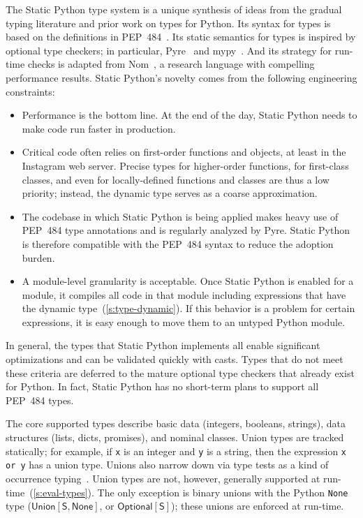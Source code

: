 \documentclass[english,cleveref,submission]{programming}
\newcommand{\SP}{Static Python}
\newcommand{\PEP}{PEP~484}
\newcommand{\code}[1]{\texttt{#1}}
\newcommand{\typefont}[1]{\mathsf{#1}}
\newcommand{\paramtype}[2]{#1[#2]}
\newcommand{\sptype}{\typefont{S}}
\newcommand{\sptnone}{\typefont{None}}
\newcommand{\sptoptional}[1]{\paramtype{\typefont{Optional}}{#1}}
\newcommand{\sptunion}[1]{\paramtype{\typefont{Union}}{#1}}
\begin{document}
The \SP{} type system is a unique synthesis of ideas from the gradual typing literature
and prior work on types for Python.
Its syntax for types is based on the definitions in \PEP{}~\cite{pep484}.
Its static semantics for types is inspired by optional type checkers; in
particular, Pyre~\cite{pyre} and mypy~\cite{mypy}.
And its strategy for run-time checks is adapted from Nom~\cite{mt-oopsla-2017,mt-oopsla-2021},
a research language with compelling performance results.
\SP{}'s novelty comes from the following engineering constraints:
\begin{itemize}
  \item
    Performance is the bottom line.
    At the end of the day, \SP{} needs to make code run faster in production.
  \item
    Critical code often relies on first-order functions and objects,
    at least in the Instagram web server.
    Precise types for higher-order functions, for first-class classes, and even for
    locally-defined functions and classes are thus a low priority; instead, the
    dynamic type serves as a coarse approximation.
  \item
    The codebase in which \SP{} is being applied makes heavy use of
    \PEP{} type annotations and is regularly analyzed by Pyre.
    \SP{} is therefore compatible with the \PEP{} syntax to reduce the
    adoption burden.
  \item
    A module-level granularity is acceptable.
    Once \SP{} is enabled for a module, it compiles all code in that module
    including expressions that have the dynamic type~(\cref{s:type-dynamic}).
    If this behavior is a problem for certain expressions, it is easy enough to move
    them to an untyped Python module.
\end{itemize}
%
In general, the types that \SP{} implements all enable significant optimizations
and can be validated quickly with casts.
Types that do not meet these criteria are deferred to the mature optional
type checkers that already exist for Python.
In fact, \SP{} has no short-term plans to support all \PEP{} types.

The core supported types describe basic data (integers, booleans, strings),
data structures (lists, dicts, promises),
and nominal classes.
Union types are tracked statically; for example, if \code{x} is an integer and
\code{y} is a string, then the expression \code{x or y} has a union type.
Unions also narrow down via type tests as a kind of occurrence
typing~\cite{tf-icfp-2010,gsk-esop-2011}.
Union types are not, however, generally supported at run-time~(\cref{s:eval-types}).
The only exception is binary unions with the Python \code{None}
type ($\sptunion{\sptype, \sptnone}$, or
$\sptoptional{\sptype}$); these unions are enforced at run-time.
\end{document}
